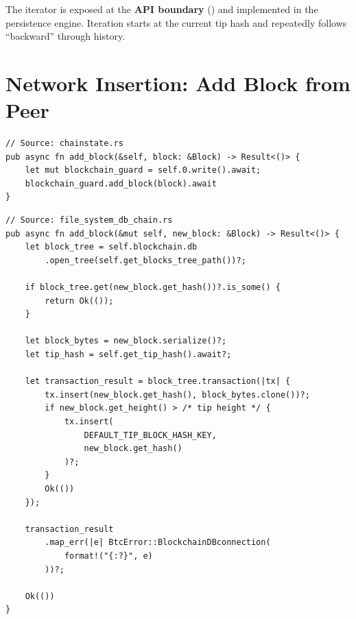 \begin{notebox}
The iterator is exposed at the \textbf{API boundary} () and implemented in the persistence engine. Iteration starts at the current tip hash and repeatedly follows  ``backward'' through history.
\end{notebox}

\section{Network Insertion: Add Block from Peer}
\label{sec:ch09-3-network-insert}

\begin{listing}[H]
\caption{Network block accepted into chain}
\label{lst:ch09-3-18}
\begin{verbatim}
// Source: chainstate.rs
pub async fn add_block(&self, block: &Block) -> Result<()> {
    let mut blockchain_guard = self.0.write().await;
    blockchain_guard.add_block(block).await
}
\end{verbatim}
\end{listing}

\begin{listing}[htbp]
\caption{Persistence layer: idempotence check, serialize, transaction, height comparison}
\label{lst:ch09-3-19}
\begin{verbatim}
// Source: file_system_db_chain.rs
pub async fn add_block(&mut self, new_block: &Block) -> Result<()> {
    let block_tree = self.blockchain.db
        .open_tree(self.get_blocks_tree_path())?;

    if block_tree.get(new_block.get_hash())?.is_some() {
        return Ok(());
    }

    let block_bytes = new_block.serialize()?;
    let tip_hash = self.get_tip_hash().await?;

    let transaction_result = block_tree.transaction(|tx| {
        tx.insert(new_block.get_hash(), block_bytes.clone())?;
        if new_block.get_height() > /* tip height */ {
            tx.insert(
                DEFAULT_TIP_BLOCK_HASH_KEY,
                new_block.get_hash()
            )?;
        }
        Ok(())
    });

    transaction_result
        .map_err(|e| BtcError::BlockchainDBconnection(
            format!("{:?}", e)
        ))?;

    Ok(())
}
\end{verbatim}
\end{listing}


